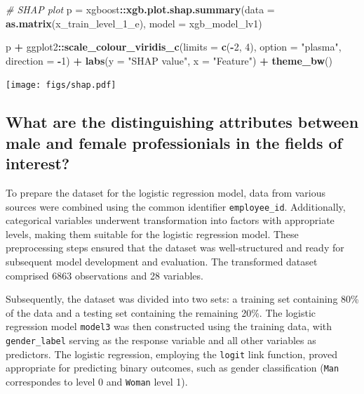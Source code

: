 \documentclass[11pt,]{article}
\newenvironment{Shaded}{\begin{snugshade}}{\end{snugshade}}
\newcommand{\AttributeTok}[1]{\textcolor[rgb]{0.13,0.29,0.53}{#1}}
\newcommand{\CommentTok}[1]{\textcolor[rgb]{0.56,0.35,0.01}{\textit{#1}}}
\newcommand{\DecValTok}[1]{\textcolor[rgb]{0.00,0.00,0.81}{#1}}
\newcommand{\FunctionTok}[1]{\textcolor[rgb]{0.13,0.29,0.53}{\textbf{#1}}}
\newcommand{\NormalTok}[1]{#1}
\newcommand{\OtherTok}[1]{\textcolor[rgb]{0.56,0.35,0.01}{#1}}
\newcommand{\SpecialCharTok}[1]{\textcolor[rgb]{0.81,0.36,0.00}{\textbf{#1}}}
\newcommand{\StringTok}[1]{\textcolor[rgb]{0.31,0.60,0.02}{#1}}
\begin{document}
\begin{Shaded}
\begin{Highlighting}[]
\CommentTok{\# SHAP plot}
\NormalTok{p }\OtherTok{=}\NormalTok{ xgboost}\SpecialCharTok{::}\FunctionTok{xgb.plot.shap.summary}\NormalTok{(}\AttributeTok{data =} \FunctionTok{as.matrix}\NormalTok{(x\_train\_level\_1\_e),}
                                   \AttributeTok{model =}\NormalTok{ xgb\_model\_lv1)}

\NormalTok{p }\SpecialCharTok{+}\NormalTok{ ggplot2}\SpecialCharTok{::}\FunctionTok{scale\_colour\_viridis\_c}\NormalTok{(}\AttributeTok{limits =} \FunctionTok{c}\NormalTok{(}\SpecialCharTok{{-}}\DecValTok{2}\NormalTok{, }\DecValTok{4}\NormalTok{),}
                                    \AttributeTok{option =} \StringTok{"plasma"}\NormalTok{, }\AttributeTok{direction =} \SpecialCharTok{{-}}\DecValTok{1}\NormalTok{) }\SpecialCharTok{+}
  \FunctionTok{labs}\NormalTok{(}\AttributeTok{y =} \StringTok{"SHAP value"}\NormalTok{, }\AttributeTok{x =} \StringTok{"Feature"}\NormalTok{) }\SpecialCharTok{+} 
  \FunctionTok{theme\_bw}\NormalTok{()}
\end{Highlighting}
\end{Shaded}

\texttt{[image: figs/shap.pdf]}

\hypertarget{what-are-the-distinguishing-attributes-between-male-and-female-professionials-in-the-fields-of-interest}{%
\subsection{What are the distinguishing attributes between male and
female professionials in the fields of
interest?}\label{what-are-the-distinguishing-attributes-between-male-and-female-professionials-in-the-fields-of-interest}}

To prepare the dataset for the logistic regression model, data from
various sources were combined using the common identifier
\texttt{employee\_id}. Additionally, categorical variables underwent
transformation into factors with appropriate levels, making them
suitable for the logistic regression model. These preprocessing steps
ensured that the dataset was well-structured and ready for subsequent
model development and evaluation. The transformed dataset comprised 6863
observations and 28 variables.

Subsequently, the dataset was divided into two sets: a training set
containing 80\% of the data and a testing set containing the remaining
20\%. The logistic regression model \texttt{model3} was then constructed
using the training data, with \texttt{gender\_label} serving as the
response variable and all other variables as predictors. The logistic
regression, employing the \texttt{logit} link function, proved
appropriate for predicting binary outcomes, such as gender
classification (\texttt{Man} correspondes to level 0 and \texttt{Woman}
level 1).
\end{document}
